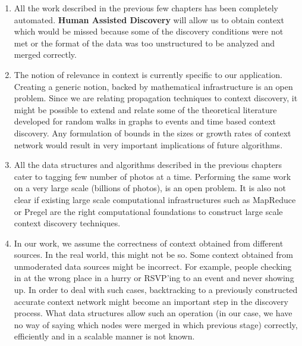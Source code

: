 \begin{enumerate}
\item All the work described in the previous few chapters has been completely automated. \textbf{Human Assisted Discovery} will allow us to obtain context which would be missed because some of the discovery conditions were not met or the format of the data was too unstructured to be analyzed and merged correctly. 

\item The notion of relevance in context is currently specific to our application. Creating a generic notion, backed by mathematical infrastructure is an open problem. Since we are relating propagation techniques to context discovery, it might be possible to extend and relate some of the theoretical literature developed for random walks in graphs to events and time based context discovery. Any formulation of bounds in the sizes or growth rates of context network would result in very important implications of future algorithms.

\item All the data structures and algorithms described in the previous chapters cater to tagging few number of photos at a time. Performing the same work on a very large scale (billions of photos), is an open problem. It is also not clear if existing large scale computational infrastructures such as MapReduce or Pregel are the right computational foundations to construct large scale context discovery techniques.

\item In our work, we assume the correctness of context obtained from different sources. In the real world, this might not be so. Some context obtained from unmoderated data sources might be incorrect. For example, people checking in at the wrong place in a hurry or RSVP'ing to an event and never showing up. In order to deal with such cases, backtracking to a previously constructed accurate context network might become an important step in the discovery process. What data structures allow such an operation (in our case, we have no way of saying which nodes were merged in which previous stage) correctly, efficiently and in a scalable manner is not known.


\end{enumerate}
